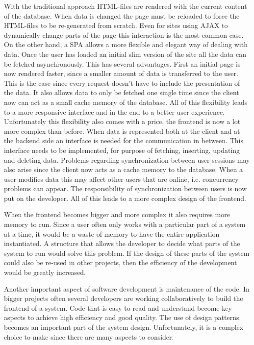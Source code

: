 With the traditional approach HTML-files are rendered with the current content of the database. When data is changed the page must be reloaded to force the HTML-files to be re-generated from scratch. Even for sites using AJAX to dynamically change parts of the page this interaction is the most common case. On the other hand, a SPA allows a more flexible and elegant way of dealing with data. Once the user has loaded an initial slim version of the site all the data can be fetched asynchronously. This has several advantages. First an initial page is now rendered faster, since a smaller amount of data is transferred to the user. This is the case since every request doesn't have to include the presentation of the data. It also allows data to only be fetched one single time since the client now can act as a small cache memory of the database. All of this flexibility leads to a more responsive interface and in the end to a better user experience. Unfortunately this flexibility also comes with a price, the frontend is now a lot more complex than before. When data is represented both at the client and at the backend side an interface is needed for the communication in between. This interface needs to be implemented, for purpose of fetching, inserting, updating and deleting data. Problems regarding synchronization between user sessions may also arise since the client now acts as a cache memory to the database. When a user modifies data this may affect other users that are online, i.e. concurrency problems can appear. The responsibility of synchronization between users is now put on the developer. All of this leads to a more complex design of the frontend.

When the frontend becomes bigger and more complex it also requires more memory to run. Since a user often only works with a particular part of a system at a time, it would be a waste of memory to have the entire application instantiated. A structure that allows the developer to decide what parts of the system to run would solve this problem. If the design of these parts of the system could also be re-used in other projects, then the efficiency of the development would be greatly increased.

Another important aspect of software development is maintenance of the code. In bigger projects often several developers are working collaboratively to build the frontend of a system. Code that is easy to read and understand become key aspects to achieve high efficiency and good quality. The use of design patterns becomes an important part of the system design. Unfortunately, it is a complex choice to make since there are many aspects to consider.

